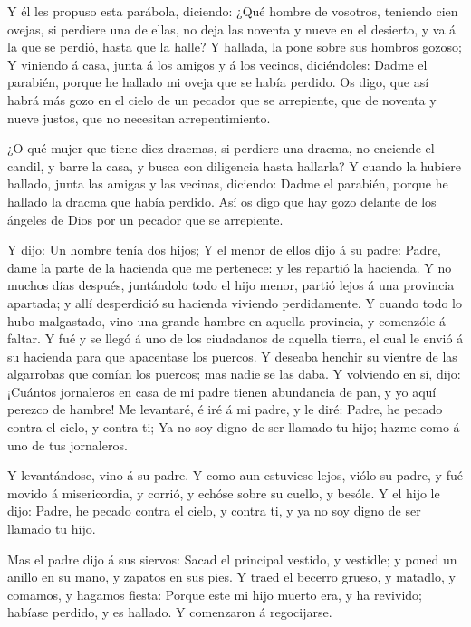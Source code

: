 Y él les propuso esta parábola, diciendo:  ¿Qué
hombre de vosotros, teniendo cien ovejas, si perdiere una de ellas, no
deja las noventa y nueve en el desierto, y va á la que se perdió, hasta
que la halle?  Y hallada, la pone sobre sus hombros gozoso;
 Y viniendo á casa, junta á los amigos y á los vecinos,
diciéndoles: Dadme el parabién, porque he hallado mi oveja que se había
perdido.  Os digo, que así habrá más gozo en el cielo de un
pecador que se arrepiente, que de noventa y nueve justos, que no
necesitan arrepentimiento.

 ¿O qué mujer que tiene diez dracmas, si perdiere una
dracma, no enciende el candil, y barre la casa, y busca con diligencia
hasta hallarla?  Y cuando la hubiere hallado, junta las
amigas y las vecinas, diciendo: Dadme el parabién, porque he hallado la
dracma que había perdido.  Así os digo que hay gozo delante
de los ángeles de Dios por un pecador que se arrepiente.

 Y dijo: Un hombre tenía dos hijos;  Y el
menor de ellos dijo á su padre: Padre, dame la parte de la hacienda que
me pertenece: y les repartió la hacienda.  Y no muchos días
después, juntándolo todo el hijo menor, partió lejos á una provincia
apartada; y allí desperdició su hacienda viviendo perdidamente.
 Y cuando todo lo hubo malgastado, vino una grande hambre
en aquella provincia, y comenzóle á faltar.  Y fué y se
llegó á uno de los ciudadanos de aquella tierra, el cual le envió á su
hacienda para que apacentase los puercos.  Y deseaba
henchir su vientre de las algarrobas que comían los puercos; mas nadie
se las daba.  Y volviendo en sí, dijo: ¡Cuántos jornaleros
en casa de mi padre tienen abundancia de pan, y yo aquí perezco de
hambre!  Me levantaré, é iré á mi padre, y le diré: Padre,
he pecado contra el cielo, y contra ti;  Ya no soy digno de
ser llamado tu hijo; hazme como á uno de tus jornaleros.

 Y levantándose, vino á su padre. Y como aun estuviese
lejos, viólo su padre, y fué movido á misericordia, y corrió, y echóse
sobre su cuello, y besóle.  Y el hijo le dijo: Padre, he
pecado contra el cielo, y contra ti, y ya no soy digno de ser llamado tu
hijo.

 Mas el padre dijo á sus siervos: Sacad el principal
vestido, y vestidle; y poned un anillo en su mano, y zapatos en sus
pies.  Y traed el becerro grueso, y matadlo, y comamos, y
hagamos fiesta:  Porque este mi hijo muerto era, y ha
revivido; habíase perdido, y es hallado. Y comenzaron á regocijarse.

